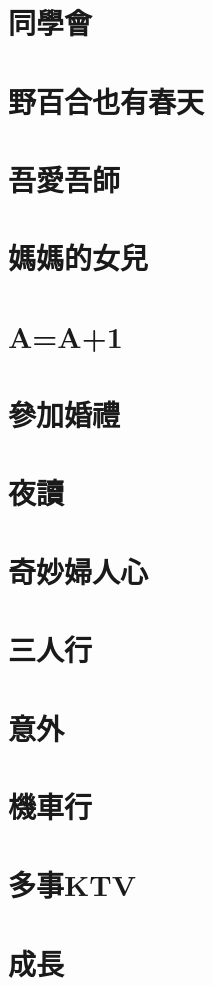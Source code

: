 \documentclass[hyperref]{ctexbook}
\begin{document}
\chapter{同學會}
\chapter{野百合也有春天}
\chapter{吾愛吾師}
\chapter{媽媽的女兒}
\chapter{A=A+1}
\chapter{參加婚禮}
\chapter{夜讀}
\chapter{奇妙婦人心}
\chapter{三人行}
\chapter{意外}
\chapter{機車行}
\chapter{多事KTV}
\chapter{成長}
\end{document}
